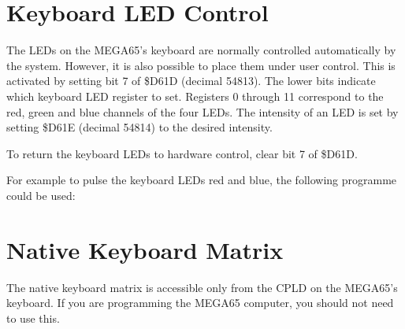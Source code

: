 \section{Keyboard LED Control}

The LEDs on the MEGA65's keyboard are normally controlled automatically
by the system.  However, it is also possible to place them under
user control.  This is activated by setting bit 7 of \$D61D (decimal 54813).
The lower bits indicate which keyboard LED register to set.  Registers 0 through 11
correspond to the red, green and blue channels of the four LEDs.  The intensity
of an LED is set by setting \$D61E (decimal 54814) to the desired intensity.

To return the keyboard LEDs to hardware control, clear bit 7 of \$D61D.

For example to pulse the keyboard LEDs red and blue, the following programme
could be used:

\begin{tcolorbox}[colback=black,coltext=white]

\end{tcolorbox}

\section{Native Keyboard Matrix}

The native keyboard matrix is accessible only from the CPLD on the MEGA65's keyboard.
If you are programming the MEGA65 computer, you should not need to use this.

